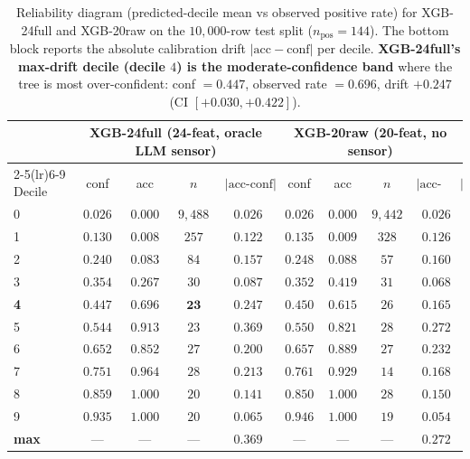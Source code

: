 \begin{table}[t]
\centering
\small
\caption{Reliability diagram (predicted-decile mean vs observed
positive rate) for XGB-24full and XGB-20raw on the $10{,}000$-row
test split ($n_{\text{pos}}{=}144$). The bottom block reports the
absolute calibration drift $|\text{acc} - \text{conf}|$ per decile.
\textbf{XGB-24full's max-drift decile (decile $4$) is the
moderate-confidence band} where the tree is most over-confident:
conf $= 0.447$, observed rate $= 0.696$, drift $+0.247$ (CI
$[+0.030, +0.422]$).}
\label{tab:p8-reliability}
\begin{tabular}{lcccccccc}
\toprule
 & \multicolumn{4}{c}{XGB-24full (24-feat, oracle LLM sensor)} & \multicolumn{4}{c}{XGB-20raw (20-feat, no sensor)} \\
\cmidrule(lr){2-5}\cmidrule(lr){6-9}
Decile & conf & acc & $n$ & $|\text{acc-conf}|$ & conf & acc & $n$ & $|\text{acc-conf}|$ \\
\midrule
0 & $0.026$ & $0.000$ & $9{,}488$ & $0.026$ & $0.026$ & $0.000$ & $9{,}442$ & $0.026$ \\
1 & $0.130$ & $0.008$ & $257$ & $0.122$ & $0.135$ & $0.009$ & $328$ & $0.126$ \\
2 & $0.240$ & $0.083$ & $84$ & $0.157$ & $0.248$ & $0.088$ & $57$ & $0.160$ \\
3 & $0.354$ & $0.267$ & $30$ & $0.087$ & $0.352$ & $0.419$ & $31$ & $0.068$ \\
\textbf{4} & $\mathbf{0.447}$ & $\mathbf{0.696}$ & $\mathbf{23}$ & $\mathbf{0.247}$ & $0.450$ & $0.615$ & $26$ & $0.165$ \\
5 & $0.544$ & $0.913$ & $23$ & $0.369$ & $0.550$ & $0.821$ & $28$ & $0.272$ \\
6 & $0.652$ & $0.852$ & $27$ & $0.200$ & $0.657$ & $0.889$ & $27$ & $0.232$ \\
7 & $0.751$ & $0.964$ & $28$ & $0.213$ & $0.761$ & $0.929$ & $14$ & $0.168$ \\
8 & $0.859$ & $1.000$ & $20$ & $0.141$ & $0.850$ & $1.000$ & $28$ & $0.150$ \\
9 & $0.935$ & $1.000$ & $20$ & $0.065$ & $0.946$ & $1.000$ & $19$ & $0.054$ \\
\midrule
\textbf{max} & --- & --- & --- & $\mathbf{0.369}$ & --- & --- & --- & $0.272$ \\
\bottomrule
\end{tabular}
\end{table}

